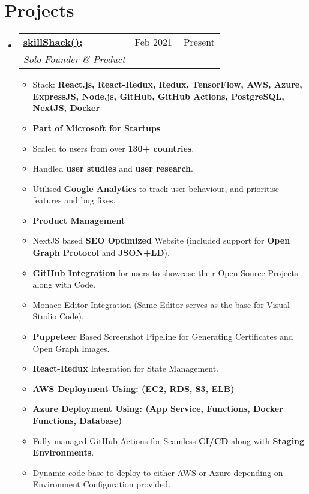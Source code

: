 \documentclass[a4paper,11pt]{article}
\makeatletter
\newcommand{\resumeItem}[1]{
  \item\large{#1}
}
\newcommand{\resumeItemListStart}{\begin{itemize}[rightmargin=0.11in]}
\newcommand{\resumeItemListEnd}{\end{itemize}}
\newcommand{\resumeQuadHeading}[4]{
  \item
  \begin{tabular*}{0.96\textwidth}[t]{l@{\extracolsep{\fill}}r}
    \textbf{#1} & #2 \\
    \textit{\large#3} & \textit{\large #4} \\
  \end{tabular*}
}
\newcommand{\resumeHeadingListStart}{
  \begin{itemize}[leftmargin=0.15in, label={}]
}
\newcommand{\resumeHeadingListEnd}{\end{itemize}}
\makeatother
\begin{document}



\section{\LARGE{Projects}}
  \resumeHeadingListStart{}
  \resumeQuadHeading{\href{https://skillshack.dev/}{\uline{skillShack();}}}{Feb 2021 -- Present}
  {Solo Founder \& Product}{}
      \resumeItemListStart{}
		\large{skillShack(); is a community for software professionals looking to share the projects they are working on and get feedback. From side projects to startups.}
		\resumeItem{Stack: \textbf{React.js, React-Redux, Redux, TensorFlow, AWS, Azure, ExpressJS, Node.js, GitHub, GitHub Actions, PostgreSQL, NextJS, Docker}}
		\resumeItem{\textbf{Part of Microsoft for Startups}}
        \resumeItem{Scaled to users from over \textbf{130+ countries}.}
		\resumeItem{Handled \textbf{user studies} and \textbf{user research}.}
		\resumeItem{Utilised \textbf{Google Analytics} to track user behaviour, and prioritise features and bug fixes.}
		\resumeItem{\textbf{Product Management}}
		\resumeItem{NextJS based \textbf{SEO Optimized} Website (included support for \textbf{Open Graph Protocol} and \textbf{JSON+LD}).}
		\resumeItem{\textbf{GitHub Integration} for users to showcase their Open Source Projects along with Code.}
		\resumeItem{Monaco Editor Integration (Same Editor serves as the base for Visual Studio Code).}
		\resumeItem{\textbf{Puppeteer} Based Screenshot Pipeline for Generating Certificates and Open Graph Images.}
		\resumeItem{\textbf{React-Redux} Integration for State Management.}
		\resumeItem{\textbf{AWS Deployment Using: (EC2, RDS, S3, ELB)}}
		\resumeItem{\textbf{Azure Deployment Using: (App Service, Functions, Docker Functions, Database)}}
		\resumeItem{Fully managed GitHub Actions for Seamless \textbf{CI/CD} along with \textbf{Staging Environments}.}
		\resumeItem{Dynamic code base to deploy to either AWS or Azure depending on Environment Configuration provided.}
      \resumeItemListEnd{}
  \resumeHeadingListEnd{}
\end{document}
